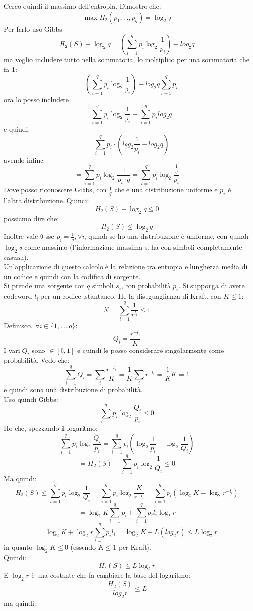 \documentclass[a4paper,12pt, oneside]{book}
\begin{document}
Cerco quindi il massimo dell'entropia. Dimostro che:
\[\max H_2(p_1,\ldots, p_q)=\log_2 q\]
Per farlo uso Gibbs:
\[H_2(S)-\log_2 q=\left(\sum_{i=1}^q p_i\log_2\frac{1}{p_i}\right)-log_2 q\]
ma voglio includere tutto nella sommatoria, lo moltiplico per una sommatoria che
fa 1:
\[=\left(\sum_{i=1}^q p_i\log_2\frac{1}{p_i}\right)-log_2q \sum_{i=1}^qp_i\]
ora lo posso includere
\[=\sum_{i=1}^q p_i\log_2\frac{1}{p_i}- \sum_{i=1}^qp_i log_2q\]
e quindi:
\[=\sum_{i=1}^qp_i\cdot\left(log_2\frac{1}{p_i}-log_2 q\right)\]
avendo infine:
\[=\sum_{i=1}^q p_i\log_2\frac{1}{p_i\cdot q}=\sum_{i=1}^q
  p_i\log_2\frac{\frac{1}{q}}{p_i}\]
Dove posso riconoscere Gibbs, con $\frac{1}{q}$ che è una distribuzione
uniforme e $p_i$ è l'altra distribuzione. Quindi:
\[H_2(S)-\log_2 q\leq 0\]
possiamo dire che:
\[H_2(S)\leq \log_2 q\]
Inoltre vale 0 sse $p_i=\frac{1}{q},\forall i$, quindi se ho una distribuzione è
uniforme, con quindi $\log_2 q$ come massimo (l'informazione massima si ha con
simboli completamente casuali).\\
Un'applicazione di questo calcolo è la relazione tra entropia e lunghezza media
di un codice e quindi con la codifica di sorgente.\\
Si prende una sorgente con $q$ simboli $s_i$, con probabilità $p_i$. Si supponga
di avere codeword $l_i$ per un codice istantaneo. Ho la disuguaglianza di Kraft,
con $K\leq 1$:
\[K=\sum_{i=1}^q\frac{1}{r^{l_i}}\leq 1\]
Definisco, $\forall i\in\{1,\ldots, q\}$:
\[Q_i=\frac{r^{-l_i}}{K}\]
I vari $Q_i$ sono $\in[0,1]$ e quindi le posso considerare singolarmente come
probabilità. Vedo che:
\[\sum_{i=1}^q Q_i=\sum_i \frac{r^{-l_i}}{K} = \frac{1}{K}\sum_i
  r^{-l_i}=\frac{1}{K}K =1\]
e quindi sono una distribuzione di probabilità.\\
Uso quindi Gibbs:
\[\sum_{i=1}^q p_i\log_2\frac{Q_i}{p_i}\leq 0\]
Ho che, spezzando il logaritmo:
\[\sum_{i=1}^q p_i\log_2\frac{Q_i}{p_i}=\sum_{i=1}^qp_i\left(
  \log_2\frac{1}{p_i}-\log_2\frac{1}{Q_i}\right)\]
\[=H_2(S)-\sum_{i=1}^qp_i\log_2\frac{1}{Q_i}\leq 0\]
Ma quindi:
\[H_2(S)\leq  \sum_{i=1}^qp_i\log_2\frac{1}{Q_i}=\sum_{i=1}^qp_i\log_2
  \frac{K}{r^{-l_i}}=\sum_{i=1}^qp_i\left(\log_2K - \log_2 r^{-l_i}\right)\]
\[=\log_2 K\sum_{i=1}^qp_i+\sum_{i=1}^qp_i l_i\log_2 r\]
\[
  =\log_2 K+\log_2 r\sum_{i=1}^qp_i l_i=\log_2 K+L(log_2 r)\leq L\log_2
  r\]
in quanto $\log_2 K\leq 0$ (essendo $K\leq 1$ per Kraft).\\
Quindi:
\[H_2(S)\leq L\log_2 r\]
E $\log_2 r$ è una costante che fa cambiare la base del logaritmo:
\[\frac{H_2(S)}{log_2 r}\leq L\]
ma quindi:
\end{document}
